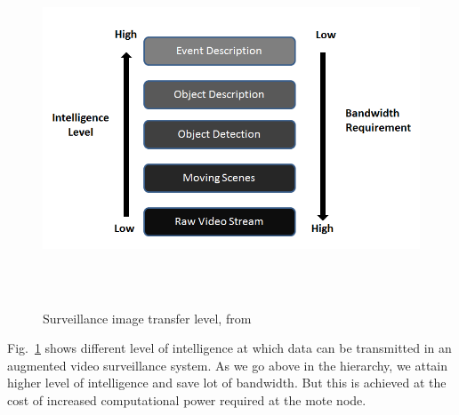 \begin{figure}[!b]
\centering
\includegraphics[height=300pt]{Figures/image_tr_level}
\caption{Surveillance image transfer level, from~\cite{3}}
\label{image_tr_level}
\end{figure}
\indent Fig.~\ref{image_tr_level} shows different level of
intelligence at which data can be transmitted in an augmented video
surveillance system. As we go above in the hierarchy, we attain higher
level of intelligence and save lot of bandwidth. But this is achieved at
the cost of increased computational power required at the mote node.
